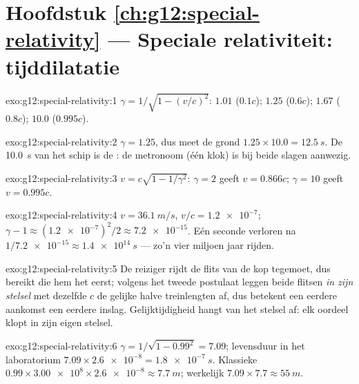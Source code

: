 \section*{Hoofdstuk \ref{ch:g12:special-relativity} --- Speciale relativiteit: tijddilatatie}

\begin{solution}{exo:g12:special-relativity:1}
$\gamma = 1/\sqrt{1 - (v/c)^2}$: $1.01$ ($0.1c$); $1.25$ ($0.6c$);
$1.67$ ($0.8c$); $10.0$ ($0.995c$).
\end{solution}

\begin{solution}{exo:g12:special-relativity:2}
$\gamma = 1.25$, dus meet de grond $1.25 \times 10.0 = \qty{12.5}{s}$. De
\qty{10.0}{s} van het schip is de : de metronoom (één klok) is bij
beide slagen aanwezig.
\end{solution}

\begin{solution}{exo:g12:special-relativity:3}
$v = c\sqrt{1 - 1/\gamma^2}$: $\gamma = 2$ geeft $v = 0.866c$; $\gamma = 10$
geeft $v = 0.995c$.
\end{solution}

\begin{solution}{exo:g12:special-relativity:4}
$v = \qty{36.1}{m/s}$, $v/c = \num{1.2e-7}$;
$\gamma - 1 \approx (\num{1.2e-7})^2/2 \approx \num{7.2e-15}$. Eén seconde
verloren na $1/\num{7.2e-15} \approx \qty{1.4e14}{s}$ --- zo'n vier miljoen
jaar rijden.
\end{solution}

\begin{solution}{exo:g12:special-relativity:5}
De reiziger rijdt de flits van de kop tegemoet, dus bereikt die hem het eerst;
volgens het tweede postulaat leggen beide flitsen \emph{in zijn stelsel} met
dezelfde $c$ de gelijke halve treinlengten af, dus betekent een eerdere
aankomst een eerdere inslag. Gelijktijdigheid hangt van het stelsel af: elk
oordeel klopt in zijn eigen stelsel.
\end{solution}

\begin{solution}{exo:g12:special-relativity:6}
$\gamma = 1/\sqrt{1 - 0.99^2} = 7.09$; levensduur in het laboratorium
$7.09 \times \num{2.6e-8} = \qty{1.8e-7}{s}$. Klassieke 
$0.99 \times \num{3.00e8} \times \num{2.6e-8} \approx \qty{7.7}{m}$;
werkelijk $7.09 \times 7.7 \approx \qty{55}{m}$.
\end{solution}


